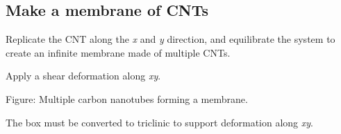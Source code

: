 \subsection{Make a membrane of CNTs}
\noindent Replicate the CNT along the \textit{x}
and \textit{y} direction, and equilibrate the system to 
create an infinite membrane made of multiple CNTs. 

\vspace{0.25cm} \noindent Apply a shear deformation along \textit{xy}.

\vspace{0.25cm} Figure: Multiple carbon nanotubes forming a membrane.  

\begin{tcolorbox}[colback=mylightblue!5!white,colframe=mylightblue!75!black,title=Hint]

\vspace{0.25cm} \noindent The box must be converted to triclinic to support deformation
along \textit{xy}.
\end{tcolorbox}

